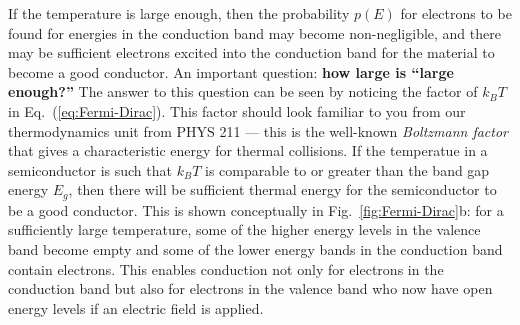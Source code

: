 If the temperature is large enough, then the probability $p(E)$ for electrons
to be found for energies in the conduction band 
may become non-negligible, and there may be sufficient electrons
excited into the conduction band for the material to become a good conductor.
An important question:  {\bf how large is ``large enough?''} The answer
to this question can be seen by noticing the factor of $k_BT$
in Eq.~(\ref{eq:Fermi-Dirac}). This factor should look familiar to you
from our thermodynamics unit from PHYS 211 --- this is the well-known
{\it Boltzmann factor} that gives a characteristic energy for thermal
collisions.  If the temperatue in a semiconductor is such that $k_BT$ is
comparable to or greater than the band gap energy $E_g$, then there will
be sufficient thermal energy for the semiconductor to be a 
good conductor. This is shown conceptually in Fig.~\ref{fig:Fermi-Dirac}b: for 
a sufficiently large temperature, some of the higher energy levels in the
valence band become empty and some of the lower energy bands in the conduction
band contain electrons. This enables conduction not only for electrons
in the conduction band but also for electrons in the valence band who now
have open energy levels if an electric field is applied.

